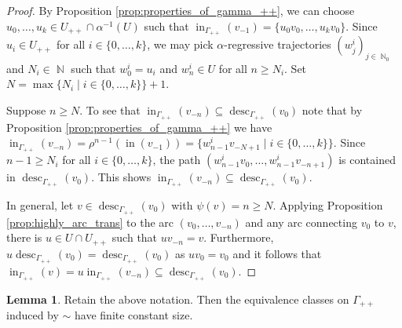 \documentclass{article}
\DeclareMathOperator\desc{desc}
\DeclareMathOperator\bbN{\mathbb{N}}
\theoremstyle{definition}
\newtheorem{lemma}[theorem]{Lemma}
\begin{document}
\begin{proof}
By Proposition \ref{prop:properties_of_gamma_++}, we can choose $u_0,\ldots, u_k\in U_{++}\cap \alpha^{-1}(U)$ such that $\operatorname{in}_{\Gamma_{++}}(v_{-1}) = \{u_0v_0,\ldots, u_{k}v_0\}$. Since $u_{i}\in U_{++}$ for all $i\in\{0,\ldots, k\}$, we may pick $\alpha$-regressive trajectories $(w_{j}^{i})_{j\in\bbN_{0}}$ and $N_i\in\bbN$ such that $w_{0}^{i} = u_{i}$ and $w^{i}_{n}\in U$ for all $n\ge N_{i}$. Set $N = \max\{N_i\mid i\in\{0,\ldots,k\}\}+1$.

Suppose $n\ge N$. To see that $\operatorname{in}_{\Gamma_{++}}(v_{-n})\subseteq\desc_{\Gamma_{++}}(v_0)$ note that by Proposition \ref{prop:properties_of_gamma_++} we have $\operatorname{in}_{\Gamma_{++}}(v_{-n}) = \rho^{n - 1}(\operatorname{in}(v_{-1})) = \{w_{n-1}^{i}v_{-N +1}\mid  i\in\{0,\ldots,k\}\}$. Since $n - 1\ge N_i$ for all $i\!\in\!\{0,\ldots , k\}$, the path $(w_{n-1}^{i}v_0,\ldots, w_{n-1}^{i}v_{-n+1})$ is contained in $\desc_{\Gamma_{++}}(v_{0})$. This shows $\operatorname{in}_{\Gamma_{++}}(v_{-n})\subseteq \desc_{\Gamma_{++}}(v_0)$. 

In general, let $v\in \desc_{\Gamma_{++}}(v_0)$ with $\psi(v)=n\ge N$. Applying Proposition \ref{prop:highly_arc_trans} to the arc $(v_0,\ldots, v_{-n})$ and any arc connecting $v_0$ to $v$, there is $u\in U\cap U_{++}$ such that $uv_{-n} = v$. Furthermore, $u\desc_{\Gamma_{++}}(v_0) = \desc_{\Gamma_{++}}(v_0)$ as $uv_0 = v_0$ and it follows that $\operatorname{in}_{\Gamma_{++}}(v) = u\operatorname{in}_{\Gamma_{++}}(v_{-n})\subseteq \desc_{\Gamma_{++}}(v_0)$.   
\end{proof}

\begin{lemma}\label{lem:equiv_classes_are_constant}
Retain the above notation. Then the equivalence classes on $\Gamma_{++}$ induced by $\sim$ have finite constant size.
\end{lemma}
\end{document}

